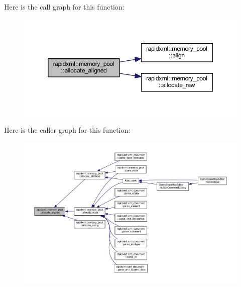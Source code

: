 Here is the call graph for this function\+:\nopagebreak
\begin{figure}[H]
\begin{center}
\leavevmode
\includegraphics[width=350pt]{classrapidxml_1_1memory__pool_a4e9cf53fa5f9da3a8f31b754bd94b4ec_cgraph}
\end{center}
\end{figure}




Here is the caller graph for this function\+:
\nopagebreak
\begin{figure}[H]
\begin{center}
\leavevmode
\includegraphics[width=350pt]{classrapidxml_1_1memory__pool_a4e9cf53fa5f9da3a8f31b754bd94b4ec_icgraph}
\end{center}
\end{figure}


